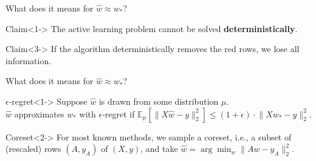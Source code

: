 \documentclass{beamer}
\newcommand{\EE}{\mathbb{E}}
\newcommand{\what}{\hat w}
\newcommand{\wopt}{w_*}
\begin{document}
\begin{frame}{What does it means for $\what \approx \wopt$?}
    \begin{block}{Claim}<1->
        The active learning problem cannot be solved \textbf{deterministically}.
    \end{block}
    
    \begin{block}{Claim}<3->
        If the algorithm deterministically removes the red rows, we lose all information.
    \end{block}
\end{frame}

\begin{frame}{What does it means for $\what \approx \wopt$?}

    \begin{block}{$\epsilon$-regret}<1->
        Suppose $\what$ is drawn from some distribution $\mu$.\\ 
        $\what$ approximates $\wopt$ with $\epsilon$-regret if
        $
            \EE_{\mu}[\lVert X\what - y \rVert_2^2] \leq 
            (1+\epsilon) \cdot \lVert Xw_* - y \rVert_2^2.
        $
    \end{block}

    \begin{block}{Coreset}<2->
        For most known methods, we sample a coreset, i.e., a subset of (rescaled) rows $(A, y_A)$  of $(X, y)$, and take $\what = \arg \min_{w} \| Aw - y_A \|_2^2$.
    \end{block}


    
\end{frame}
\end{document}
